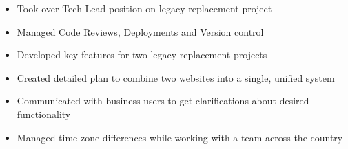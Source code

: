\documentclass[12pt,letterpaper,sans]{moderncv}
\begin{document}
	\begin{itemize}[leftmargin=1.24in]
		\item Took over Tech Lead position on legacy replacement project
		\item Managed Code Reviews, Deployments and Version control
		\item Developed key features for two legacy replacement projects
		\item Created detailed plan to combine two websites into a single, unified system
		\item Communicated with business users to get clarifications about desired functionality
		\item Managed time zone differences while working with a team across the country
	\end{itemize} 
\end{document}
